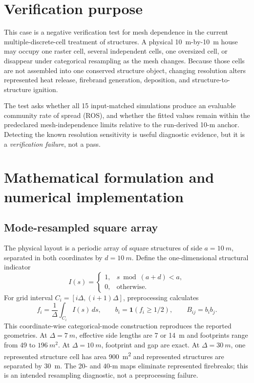\section{Verification purpose}

This case is a negative verification test for mesh dependence in the current
multiple-discrete-cell treatment of structures. A physical
\SI{10}{m}-by-\SI{10}{m} house may occupy one raster cell, several independent
cells, one oversized cell, or disappear under categorical resampling as the
mesh changes. Because those cells are not assembled into one conserved
structure object, changing resolution alters represented heat release,
firebrand generation, deposition, and structure-to-structure ignition.

The test asks whether all 15 input-matched simulations produce an
evaluable community rate of spread (ROS), and whether the fitted values remain
within the predeclared mesh-independence limits relative to the run-derived
10-m anchor. Detecting the known resolution sensitivity is useful diagnostic
evidence, but it is a \emph{verification failure}, not a pass.

\section{Mathematical formulation and numerical implementation}

\subsection{Mode-resampled square array}

The physical layout is a periodic array of square structures of side
\(a=\SI{10}{m}\), separated in both coordinates by
\(d=\SI{10}{m}\). Define the one-dimensional structural indicator
\[
 I(s)=\begin{cases}1,&s\bmod(a+d)<a,\\0,&\text{otherwise.}\end{cases}
\]
For grid interval \(C_i=[i\Delta,(i+1)\Delta]\), preprocessing calculates
\[
 f_i=\frac{1}{\Delta}\int_{C_i}I(s)\,ds,
 \qquad b_i=\mathbf{1}(f_i\ge 1/2),
 \qquad B_{ij}=b_i b_j .
\]
This coordinate-wise categorical-mode construction reproduces the reported
geometries. At \(\Delta=\SI{7}{m}\), effective side lengths are 7 or
\SI{14}{m} and footprints range from 49 to \(\SI{196}{m^2}\). At
\(\Delta=\SI{10}{m}\), footprint and gap are exact. At
\(\Delta=\SI{30}{m}\), one represented structure cell has area
\SI{900}{m^2} and represented structures are separated by \SI{30}{m}.
The 20- and 40-m maps eliminate represented firebreaks; this is an intended
resampling diagnostic, not a preprocessing failure.

